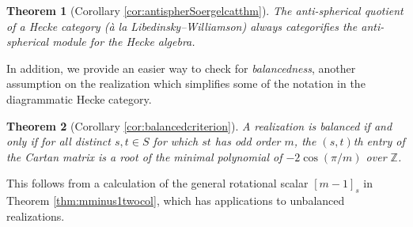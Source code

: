 \documentclass{amsart}
\theoremstyle{plain}
\newtheorem{thmletter}{Theorem}[section]
\theoremstyle{definition}
\theoremstyle{remark}
\numberwithin{equation}{section}
\newcommand{\defnemph}[1]{\emph{#1}}
\newcommand{\ZZ}{\mathbb{Z}}
\begin{document}
\begin{thmletter}[{Corollary \ref{cor:antispherSoergelcatthm}}] \label{thm:intro2}
The anti-spherical quotient of a Hecke category (\textit{\`{a} la} Libedinsky--Williamson) always categorifies the anti-spherical module for the Hecke algebra.
\end{thmletter}

In addition, we provide an easier way to check for \defnemph{balancedness}, another assumption on the realization which simplifies some of the notation in the diagrammatic Hecke category.

\begin{thmletter}[{Corollary \ref{cor:balancedcriterion}}]
A realization is balanced if and only if for all distinct $s,t \in S$ for which $st$ has odd order $m$, the $(s,t)$th entry of the Cartan matrix is a root of the minimal polynomial of $-2\cos(\pi/m)$ over $\ZZ$. 
\end{thmletter}

This follows from a calculation of the general rotational scalar $[m-1]_s$ in Theorem \ref{thm:mminus1twocol}, which has applications to unbalanced realizations.

%
%
%
%
%
%
%
%
%
%
%
%
%
\end{document}
